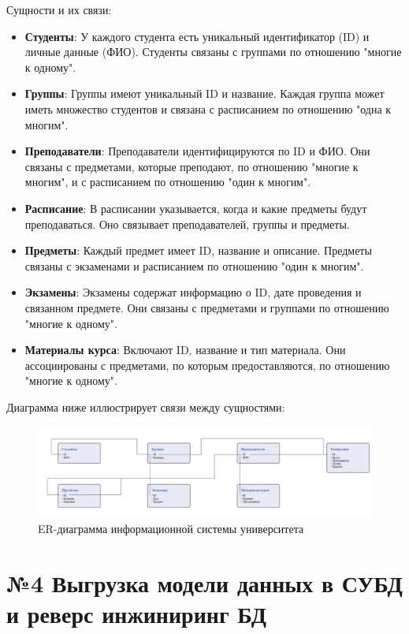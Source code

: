 \documentclass[a4paper,12pt]{article}
\begin{document}
Сущности и их связи:

\begin{itemize}
  \item \textbf{Студенты}: У каждого студента есть уникальный идентификатор (ID) и личные данные (ФИО). Студенты связаны с группами по отношению "многие к одному".
  \item \textbf{Группы}: Группы имеют уникальный ID и название. Каждая группа может иметь множество студентов и связана с расписанием по отношению "одна к многим".
  \item \textbf{Преподаватели}: Преподаватели идентифицируются по ID и ФИО. Они связаны с предметами, которые преподают, по отношению "многие к многим", и с расписанием по отношению "один к многим".
  \item \textbf{Расписание}: В расписании указывается, когда и какие предметы будут преподаваться. Оно связывает преподавателей, группы и предметы.
  \item \textbf{Предметы}: Каждый предмет имеет ID, название и описание. Предметы связаны с экзаменами и расписанием по отношению "один к многим".
  \item \textbf{Экзамены}: Экзамены содержат информацию о ID, дате проведения и связанном предмете. Они связаны с предметами и группами по отношению "многие к одному".
  \item \textbf{Материалы курса}: Включают ID, название и тип материала. Они ассоциированы с предметами, по которым предоставляются, по отношению "многие к одному".
\end{itemize}

Диаграмма ниже иллюстрирует связи между сущностями:

\begin{figure}[-h]
  \centering
  \includegraphics[width=\textwidth]{ER.png}
  \caption{ER-диаграмма информационной системы университета}
\end{figure}

\clearpage
\section*{№4 Выгрузка модели данных в СУБД и реверс инжиниринг БД}
\end{document}
